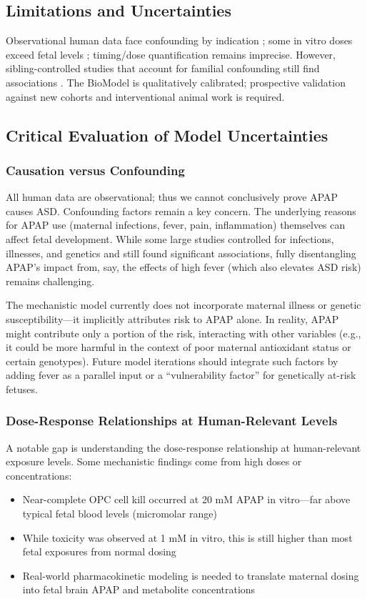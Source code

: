 \documentclass[11pt]{article}
\let\oldsubsection\subsection
\renewcommand{\subsection}[1]{\oldsubsection{#1}\setlength{\leftskip}{0.75em}}
\let\oldsubsubsection\subsubsection
\renewcommand{\subsubsection}[1]{\oldsubsubsection{#1}\setlength{\leftskip}{1.5em}}
\begin{document}
\subsection{Limitations and Uncertainties}
Observational human data face confounding by indication \citep{liew2016}; some in vitro doses exceed fetal levels \citep{perez2012}; timing/dose quantification remains imprecise. However, sibling-controlled studies that account for familial confounding still find associations \citep{brandlistuen2013,stergiakouli2016}. The BioModel is qualitatively calibrated; prospective validation against new cohorts and interventional animal work is required.

\subsection{Critical Evaluation of Model Uncertainties}

\subsubsection{Causation versus Confounding}
All human data are observational; thus we cannot conclusively prove APAP causes ASD. Confounding factors remain a key concern. The underlying reasons for APAP use (maternal infections, fever, pain, inflammation) themselves can affect fetal development. While some large studies controlled for infections, illnesses, and genetics and still found significant associations, fully disentangling APAP's impact from, say, the effects of high fever (which also elevates ASD risk) remains challenging.

The mechanistic model currently does not incorporate maternal illness or genetic susceptibility—it implicitly attributes risk to APAP alone. In reality, APAP might contribute only a portion of the risk, interacting with other variables (e.g., it could be more harmful in the context of poor maternal antioxidant status or certain genotypes). Future model iterations should integrate such factors by adding fever as a parallel input or a ``vulnerability factor'' for genetically at-risk fetuses.

\subsubsection{Dose-Response Relationships at Human-Relevant Levels}
A notable gap is understanding the dose-response relationship at human-relevant exposure levels. Some mechanistic findings come from high doses or concentrations:
\begin{itemize}
    \item Near-complete OPC cell kill occurred at 20 mM APAP in vitro—far above typical fetal blood levels (micromolar range)
    \item While toxicity was observed at 1 mM in vitro, this is still higher than most fetal exposures from normal dosing
    \item Real-world pharmacokinetic modeling is needed to translate maternal dosing into fetal brain APAP and metabolite concentrations
\end{itemize}
\end{document}
